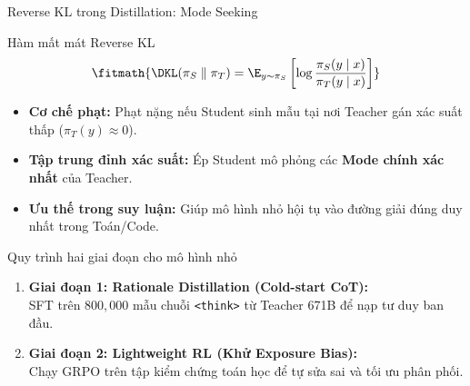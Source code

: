 \begin{frame}{Reverse KL trong Distillation: Mode Seeking}
  \begin{block}{Hàm mất mát Reverse KL}
    \[
      \fitmath{%
      \DKL(\pi_S \parallel \pi_T) = \E_{y \sim \pi_S} \left[ \log \frac{\pi_S(y \mid x)}{\pi_T(y \mid x)} \right]
      }
    \]
  \end{block}

  \small
  \begin{itemize}\setlength{\itemsep}{5pt}
    \item \textbf{Cơ chế phạt:} Phạt nặng nếu Student sinh mẫu tại nơi Teacher gán xác suất thấp ($\pi_T(y) \approx 0$).
    \item \textbf{Tập trung đỉnh xác suất:} Ép Student mô phỏng các \textbf{Mode chính xác nhất} của Teacher.
    \item \textbf{Ưu thế trong suy luận:} Giúp mô hình nhỏ hội tụ vào đường giải đúng duy nhất trong Toán/Code.
  \end{itemize}
  \par\vspace{0pt}
\end{frame}

\begin{frame}{Quy trình hai giai đoạn cho mô hình nhỏ}
  \small
  \begin{enumerate}\setlength{\itemsep}{6pt}
    \item \textbf{Giai đoạn 1: Rationale Distillation (Cold-start CoT):}\\
      SFT trên $800{,}000$ mẫu chuỗi \texttt{<think>} từ Teacher 671B để nạp tư duy ban đầu.
    \item \textbf{Giai đoạn 2: Lightweight RL (Khử Exposure Bias):}\\
      Chạy GRPO trên tập kiểm chứng toán học để tự sửa sai và tối ưu phân phối.
  \end{enumerate}

  \vspace{0.15cm}
  \par\vspace{0pt}
\end{frame}

